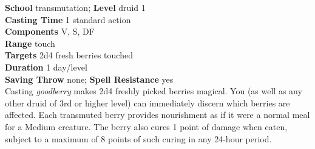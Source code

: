 \textbf{School} transmutation; \textbf{Level} druid 1\\
\textbf{Casting Time} 1 standard action\\
\textbf{Components} V, S, DF\\
\textbf{Range} touch\\
\textbf{Targets} 2d4 fresh berries touched\\
\textbf{Duration} 1 day/level\\
\textbf{Saving Throw} none; \textbf{Spell Resistance} yes\\
Casting \textit{goodberry }makes 2d4 freshly picked berries magical. You (as well as any other druid of 3rd or higher level) can immediately discern which berries are affected. Each transmuted berry provides nourishment as if it were a normal meal for a Medium creature. The berry also cures 1 point of damage when eaten, subject to a maximum of 8 points of such curing in any 24-hour period.\\
